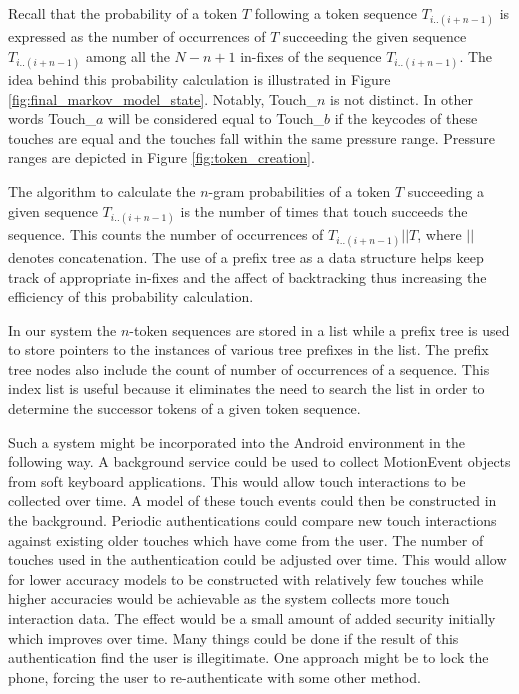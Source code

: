 \documentclass{acm_proc_article-sp}
\begin{document}
Recall that the probability of a token $T$ following  a token sequence $T_{i..(i+n-1)}$ is 
expressed as the number of occurrences of $T$ succeeding the given sequence $T_{i..(i+n-1)}$ among
all the $N-n+1$ in-fixes of the sequence $T_{i..(i+n-1)}$.
The idea behind this probability calculation is illustrated in Figure \ref{fig:final_markov_model_state}.
Notably, Touch\_$n$ is not distinct.
In other words Touch\_$a$ will be considered equal to Touch\_$b$ if the keycodes of these touches are equal and the touches fall within the same pressure range. Pressure ranges are depicted in Figure \ref{fig:token_creation}.

The algorithm to calculate the $n$-gram probabilities of
a token $T$ succeeding a given sequence
$T_{i..(i+n-1)}$ is the number of times that touch succeeds the sequence.
This counts the  number of 
occurrences of $T_{i..(i+n-1)}||T$,
where $||$ denotes concatenation.
The use of a prefix tree as a data structure helps keep track of appropriate
in-fixes and the affect of backtracking thus increasing the efficiency of this probability calculation.

In our system the $n$-token sequences are stored in a list
while a prefix tree is used to store pointers to the
instances of various tree prefixes in the list.
The prefix tree nodes also include the count of number of occurrences of a sequence.
This index list is useful because it eliminates the need to search the list in order to determine the successor tokens of
a given token sequence.

Such a system might be incorporated 
into the Android environment in the following way.
A background service could be used to collect MotionEvent objects
from soft keyboard applications.
This would allow touch interactions to be collected over time.
A model of these touch events could then
be constructed in the background.
Periodic authentications could compare new touch interactions 
against existing older touches which have come from the user.
%
The number of touches used in the authentication could be
adjusted over time.
This would allow for lower accuracy models to be
constructed with relatively few touches while
higher accuracies would be achievable as
the system collects more touch interaction data.
The effect would be a small amount of added
security initially which improves over time.
%
Many things could be done if the result of this authentication
find the user is illegitimate.
One approach might be to lock the phone,
forcing the user to re-authenticate with some other method.
\end{document}
